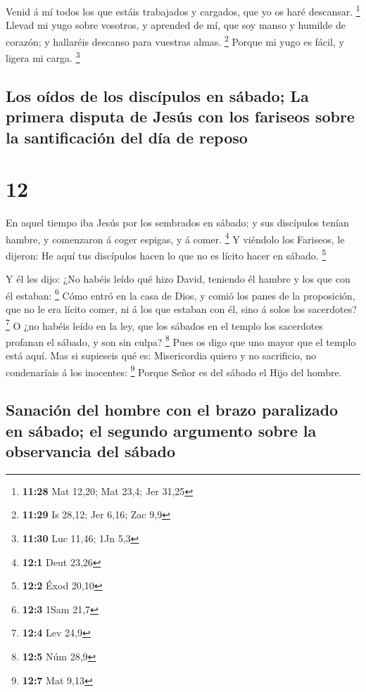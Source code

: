  Venid á mí todos los que estáis trabajados y cargados, que
yo os haré descansar. \footnote{\textbf{11:28} Mat 12,20; Mat 23,4; Jer
  31,25}  Llevad mi yugo sobre vosotros, y aprended de mí,
que soy manso y humilde de corazón; y hallaréis descanso para vuestras
almas. \footnote{\textbf{11:29} Is 28,12; Jer 6,16; Zac 9,9}
 Porque mi yugo es fácil, y ligera mi carga. \footnote{\textbf{11:30}
  Luc 11,46; 1Jn 5,3}

\hypertarget{los-ouxeddos-de-los-discuxedpulos-en-suxe1bado-la-primera-disputa-de-jesuxfas-con-los-fariseos-sobre-la-santificaciuxf3n-del-duxeda-de-reposo}{%
\subsection{Los oídos de los discípulos en sábado; La primera disputa de
Jesús con los fariseos sobre la santificación del día de
reposo}\label{los-ouxeddos-de-los-discuxedpulos-en-suxe1bado-la-primera-disputa-de-jesuxfas-con-los-fariseos-sobre-la-santificaciuxf3n-del-duxeda-de-reposo}}

\hypertarget{section-11}{%
\section{12}\label{section-11}}

 En aquel tiempo iba Jesús por los sembrados en sábado; y
sus discípulos tenían hambre, y comenzaron á coger espigas, y á comer.
\footnote{\textbf{12:1} Deut 23,26}  Y viéndolo los
Fariseos, le dijeron: He aquí tus discípulos hacen lo que no es lícito
hacer en sábado. \footnote{\textbf{12:2} Éxod 20,10}

 Y él les dijo: ¿No habéis leído qué hizo David, teniendo él
hambre y los que con él estaban: \footnote{\textbf{12:3} 1Sam 21,7}
 Cómo entró en la casa de Dios, y comió los panes de la
proposición, que no le era lícito comer, ni á los que estaban con él,
sino á solos los sacerdotes? \footnote{\textbf{12:4} Lev 24,9}
 O ¿no habéis leído en la ley, que los sábados en el templo
los sacerdotes profanan el sábado, y son sin culpa? \footnote{\textbf{12:5}
  Núm 28,9}  Pues os digo que uno mayor que el templo está
aquí.  Mas si supieseis qué es: Misericordia quiero y no
sacrificio, no condenaríais á los inocentes: \footnote{\textbf{12:7} Mat
  9,13}  Porque Señor es del sábado el Hijo del hombre.

\hypertarget{sanaciuxf3n-del-hombre-con-el-brazo-paralizado-en-suxe1bado-el-segundo-argumento-sobre-la-observancia-del-suxe1bado}{%
\subsection{Sanación del hombre con el brazo paralizado en sábado; el
segundo argumento sobre la observancia del
sábado}\label{sanaciuxf3n-del-hombre-con-el-brazo-paralizado-en-suxe1bado-el-segundo-argumento-sobre-la-observancia-del-suxe1bado}}

